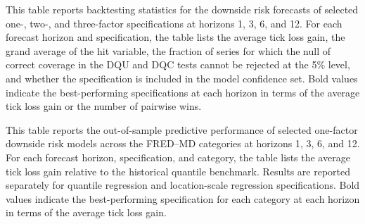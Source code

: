 \documentclass[12pt]{article}
\newcommand{\tablesdir}{tables}
\begin{document}
\clearpage
\begin{table}[!htbp]
	\caption{\sc Downside Risk Prediction Using Multiple Factors}\label{tbl:oos:mfac}
	\vspace{-1.5em}
\begin{center}
\begin{tiny}

\end{tiny}
\end{center}
	\vspace{-1.5em}
{\hspace{1em} \footnotesize This table reports backtesting statistics for the downside risk forecasts of selected one-, two-, and three-factor specifications at horizons 1, 3, 6, and 12.
 For each forecast horizon and specification, the table lists the average tick loss gain, the grand average of the hit variable,
 the fraction of series for which the null of correct coverage in the DQU and DQC tests cannot be rejected at the 5\% level,
 and whether the specification is included in the model confidence set. Bold values indicate the best-performing specifications at each horizon in terms of the average tick loss gain or the number of pairwise wins.
}

\end{table}

\clearpage
\begin{table}[!htbp]
	\caption{\sc Downside Risk Prediction for the FRED-MD Categories}\label{tbl:oos:cat}
\begin{center}
\begin{tiny}

\end{tiny}
\end{center}

{\hspace{1em} \footnotesize This table reports the out-of-sample predictive performance of selected one-factor downside risk models across the FRED--MD categories at horizons 1, 3, 6, and 12. For each forecast horizon, specification, and category, the table lists the average tick loss gain relative to the historical quantile benchmark. Results are reported separately for quantile regression and location-scale regression specifications. Bold values indicate the best-performing specification for each category at each horizon in terms of the average tick loss gain.}

\end{table}
\end{document}
